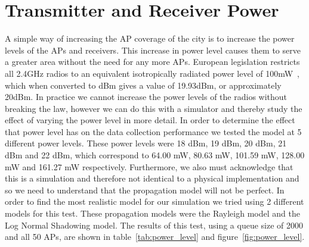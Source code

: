     \section{Transmitter and Receiver Power}\label{data_gathering_performance_transmitter_and_reciever_power}

        A simple way of increasing the AP coverage of the city is to increase the power levels of the APs and receivers. This increase in power level causes them to serve a greater area without the need for any more APs. European legislation restricts all 2.4GHz radios to an equivalent isotropically radiated power level of 100mW~\cite{rackley2011wireless}, which when converted to dBm gives a value of 19.93dBm, or approximately 20dBm. In practice we cannot increase the power levels of the radios without breaking the law, however we can do this with a simulator and thereby study the effect of varying the power level in more detail. In order to determine the effect that power level has on the data collection performance we tested the model at 5 different power levels. These power levels were 18 dBm, 19 dBm, 20 dBm, 21 dBm and 22 dBm, which correspond to 64.00 mW, 80.63 mW, 101.59 mW, 128.00 mW and 161.27 mW respectively. Furthermore, we also must acknowledge that this is a simulation and therefore not identical to a physical implementation and so we need to understand that the propagation model will not be perfect. In order to find the most realistic model for our simulation we tried using 2 different models for this test. These propagation models were the Rayleigh model and the Log Normal Shadowing model. The results of this test, using a queue size of 2000 and all 50 APs, are shown in table~\ref{tab:power_level} and figure~\ref{fig:power_level}. 


